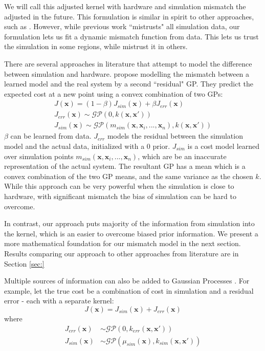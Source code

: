We will call this adjusted kernel with hardware and simulation mismatch the adjusted \dogkernel in the future.
This formulation is similar in spirit to other approaches, such as \cite{marco2017virtual}. However, while previous work ``mistrusts" all simulation data, our formulation lets us fit a dynamic mismatch function from data. This lets us trust the simulation in some regions, while mistrust it in others.

There are several approaches in literature that attempt to model the difference between simulation and hardware. \cite{wilson2014using} propose modelling the mismatch between a learned model and the real system by a second ``residual" GP. They predict the expected cost at a new point using a convex combination of two GPs:  
\begin{align}
    J(\pmb{x}) = (1-\beta) J_{sim}(\pmb{x}) + \beta J_{err}(\pmb{x}) \\
    J_{err}(\pmb{x}) \sim \mathcal{GP}(0, k(\pmb{x},\pmb{x}')) \\ 
    J_{sim}(\pmb{x}) \sim \mathcal{GP}(m_{sim}(\pmb{x},\pmb{x}_i,...,\pmb{x}_n), k(\pmb{x},\pmb{x}'))
\end{align}
$\beta$ can be learned from data. $J_{err}$ models the residual between the simulation model and the actual data, initialized with a 0 prior. $J_{sim}$ is a cost model learned over simulation points $m_{sim}(\pmb{x},\pmb{x}_i,...,\pmb{x}_n)$, which are be an inaccurate representation of the actual system. The resultant GP has a mean which is a convex combination of the two GP means, and the same variance as the chosen $k$. While this approach can be very powerful when the simulation is close to hardware, with significant mismatch the bias of simulation can be hard to overcome.

In contrast, our approach puts majority of the information from simulation into the kernel, which is an easier to overcome biased prior information. We present a more mathematical foundation for our mismatch model in the next section. Results comparing our approach to other approaches from literature are in Section \ref{sec:}


Multiple sources of information can also be added to Gaussian Processes \citep{poloczek2016multi}. For example, let the true cost be a combination of cost in simulation and a residual error - each with a separate kernel:
\begin{equation}
    J(\pmb{x}) = J_{sim}(\pmb{x}) + J_{err}(\pmb{x})
\end{equation}
where
\begin{align}
     J_{err}(\pmb{x}) &\sim \mathcal{GP}(0, k_{err}(\pmb{x},\pmb{x}')) \\
J_{sim}(\pmb{x}) &\sim \mathcal{GP}(\mu_{sim}(\pmb{x}), k_{sim}(\pmb{x},\pmb{x}'))
\end{align}

